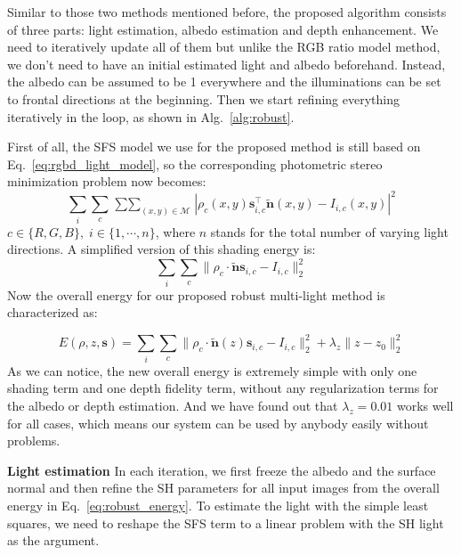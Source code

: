 Similar to those two methods mentioned before, the proposed algorithm consists of three parts: light estimation, albedo estimation and depth enhancement. 
We need to iteratively update all of them but unlike the RGB ratio model method, we don't need to have an initial estimated light and albedo beforehand.
Instead, the albedo can be assumed to be 1 everywhere and the illuminations can be set to frontal directions at the beginning.
Then we start refining everything iteratively in the loop, as shown in Alg.~\ref{alg:robust}.

First of all, the SFS model we use for the proposed method is still based on Eq.~\ref{eq:rgbd_light_model}, so the corresponding photometric stereo minimization problem now becomes:
\begin{equation}
    \sum_{i} \sum_{c} \mathop{\sum \sum}_{(x,y) \in \mathcal{M}} |\rho_c(x,y) \mathbf{s}_{i,c}^\top\tilde{\mathbf{n}}(x,y) - I_{i,c}(x,y)|^2 
\end{equation}
$c\in\{R,G,B\},\; i\in\{ 1, \cdots, n\}$, where $n$ stands for the total number of varying light directions.
A simplified version of this shading energy is:
\begin{equation}
    \sum_{i} \sum_{c} \lVert\rho_c \cdot \tilde{\mathbf{n}}\mathbf{s}_{i,c} -  I_{i,c} \rVert_2^2 
\end{equation}
Now the overall energy for our proposed robust multi-light method is characterized as:

\begin{equation}\label{eq:robust_energy}
    E(\rho, z, \mathbf{s}) = \sum_{i} \sum_{c} \lVert \rho_c \cdot \tilde{\mathbf{n}}(z)\mathbf{s}_{i,c}  - I_{i,c}\rVert_2^2  + \lambda_{z}\lVert z - z_0 \rVert_2^2
\end{equation}
As we can notice, the new overall energy is extremely simple with only one shading term and one depth fidelity term, without any regularization terms for the albedo or depth estimation.
And we have found out that $\lambda_z = 0.01$ works well for all cases, which means our system can be used by anybody easily without problems.

\textbf{Light estimation}
In each iteration, we first freeze the albedo and the surface normal and then refine the SH parameters for all input images from the overall energy in Eq.~\ref{eq:robust_energy}.
To estimate the light with the simple least squares, we need to reshape the SFS term to a linear problem with the SH light as the argument. 

